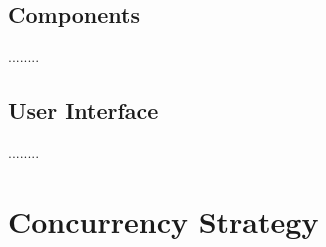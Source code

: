 \documentclass[12pt]{article}
\begin{document}



\subsection{Components} %

........

\subsection{User Interface} %

........

\newpage
\section{Concurrency Strategy} %
\end{document}

